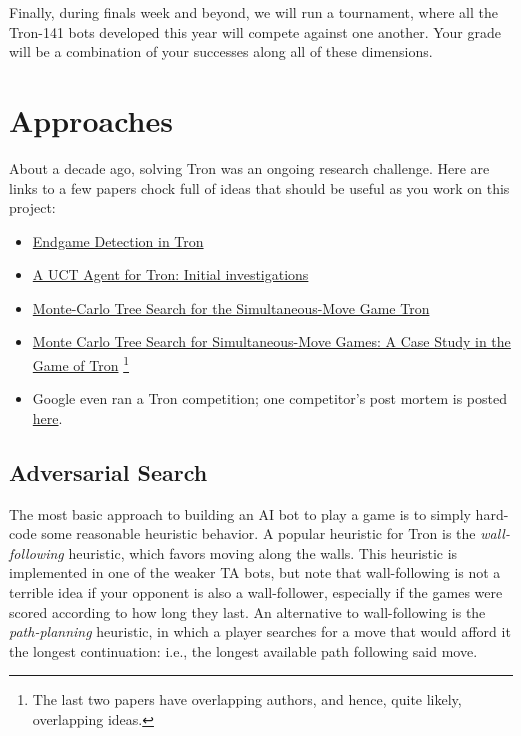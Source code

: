 \documentclass{article}
\begin{document}
Finally, during finals week and beyond, we will run a tournament,
where all the Tron-141 bots developed this year will compete against
one another.  Your grade will be a combination of your successes along
all of these dimensions.


\section{Approaches}

About a decade ago, solving Tron was an ongoing research challenge.
Here are links to a few papers chock full of ideas that should be
useful as you work on this project:

\begin{itemize}
\item \href{https://project.dke.maastrichtuniversity.nl/games/files/bsc/Kang_Bsc-paper.pdf}{Endgame Detection in Tron}
  \\ [-4ex]
  
\item \href{https://ieeexplore.ieee.org/document/5593331}{A UCT Agent for Tron: Initial investigations}
  \\ [-4ex]

\item \href{https://dke.maastrichtuniversity.nl/m.winands/documents/Tronpaper.pdf}{Monte-Carlo Tree Search for the Simultaneous-Move Game Tron}
  \\ [-4ex]

\item \href{http://mlanctot.info/files/papers/sm-tron-bnaic2013.pdf}{Monte Carlo Tree Search for Simultaneous-Move Games: A Case Study in the Game of Tron}%
\footnote{The last two papers have overlapping authors, and hence, quite likely, overlapping ideas.}
  \\ [-4ex]

\item Google even ran a Tron competition; one competitor's post mortem is posted
\href{https://www.a1k0n.net/2010/03/04/google-ai-postmortem.html}{here}.
  \\ [-4ex]
\end{itemize}


\subsection{Adversarial Search}
The most basic approach to building an AI bot to play a game is to
simply hard-code some reasonable heuristic behavior.  A popular
heuristic for Tron is the \emph{wall-following\/} heuristic, which
favors moving along the walls.  This heuristic is implemented in one
of the weaker TA bots, but note that wall-following is not a terrible
idea if your opponent is also a wall-follower,
especially if the games were scored according to how long they last.
%
An alternative to wall-following is the \emph{path-planning\/}
heuristic, in which a player searches for a move that would afford it
the longest continuation: i.e., the longest available path following said move.
\end{document}
